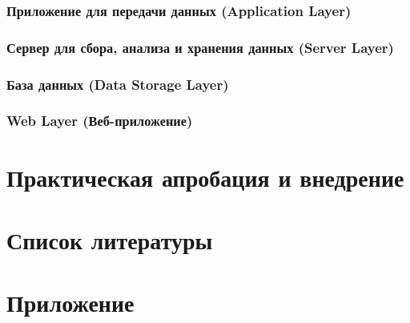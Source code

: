 \documentclass[12pt, russian]{extarticle}
\begin{document}
\begin{spacing}{1.5}
\subsubsection{Приложение для передачи данных (Application Layer)}

\subsubsection{Сервер для сбора, анализа и хранения данных (Server Layer)}

\subsubsection{База данных (Data Storage Layer)}

\subsubsection{Web Layer (Веб-приложение)}

\newpage
\section{Практическая апробация и внедрение}

\newpage
\section{Список литературы}


\newpage
\section{Приложение}

\end{spacing}
\end{document}
